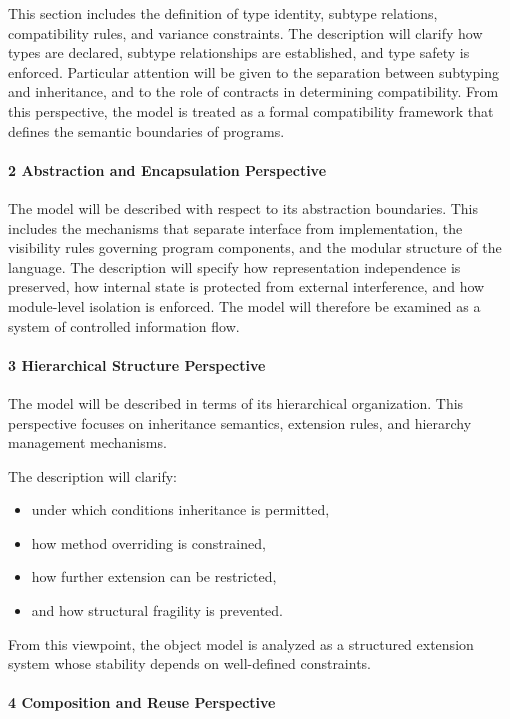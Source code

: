 This section includes the definition of type identity, subtype relations, compatibility rules, and variance constraints. The description will clarify how types are declared, subtype relationships are established, and type safety is enforced. Particular attention will be given to the separation between subtyping and inheritance, and to the role of contracts in determining compatibility.
From this perspective, the model is treated as a formal compatibility framework that defines the semantic boundaries of programs.

\paragraph{2 Abstraction and Encapsulation Perspective}

The model will be described with respect to its abstraction boundaries. This includes the mechanisms that separate interface from implementation, the visibility rules governing program components, and the modular structure of the language.
The description will specify how representation independence is preserved, how internal state is protected from external interference, and how module-level isolation is enforced. The model will therefore be examined as a system of controlled information flow.

\paragraph{3 Hierarchical Structure Perspective}

The model will be described in terms of its hierarchical organization. This perspective focuses on inheritance semantics, extension rules, and hierarchy management mechanisms.

The description will clarify:
\begin{itemize}
    \item under which conditions inheritance is permitted,
    \item how method overriding is constrained,
    \item how further extension can be restricted,
    \item and how structural fragility is prevented.
\end{itemize}

From this viewpoint, the object model is analyzed as a structured extension system whose stability depends on well-defined constraints.

\paragraph{4 Composition and Reuse Perspective}


